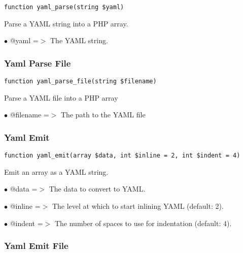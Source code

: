 \documentclass[a4paper]{article}
\begin{document}
\begin{lstlisting}
function yaml_parse(string $yaml)
\end{lstlisting}

Parse a YAML string into a PHP array.

\begin{compactitem}
\item[\color{myblue}$\bullet$] @yaml =$>$ The YAML string.
\end{compactitem}

\hypertarget{toc286}{}
\subsubsection{Yaml Parse File}

\begin{lstlisting}
function yaml_parse_file(string $filename)
\end{lstlisting}

Parse a YAML file into a PHP array

\begin{compactitem}
\item[\color{myblue}$\bullet$] @filename =$>$ The path to the YAML file
\end{compactitem}

\hypertarget{toc287}{}
\subsubsection{Yaml Emit}

\begin{lstlisting}
function yaml_emit(array $data, int $inline = 2, int $indent = 4)
\end{lstlisting}

Emit an array as a YAML string.

\begin{compactitem}
\item[\color{myblue}$\bullet$] @data   =$>$ The data to convert to YAML.
\item[\color{myblue}$\bullet$] @inline =$>$ The level at which to start inlining YAML (default: 2).
\item[\color{myblue}$\bullet$] @indent =$>$ The number of spaces to use for indentation (default: 4).
\end{compactitem}

\hypertarget{toc288}{}
\subsubsection{Yaml Emit File}
\end{document}
